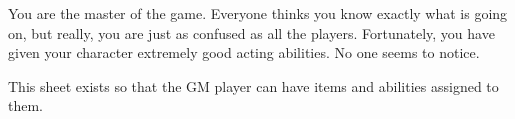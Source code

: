 \documentclass[char]{elementals}
\begin{document}
\name{\cGM{}}

You are the master of the game. Everyone thinks you know exactly what is going on, but really, you are just as confused as all the players. Fortunately, you have given your character extremely good acting abilities. No one seems to notice.

This sheet exists so that the GM player can have items and abilities assigned to them.
\end{document}
